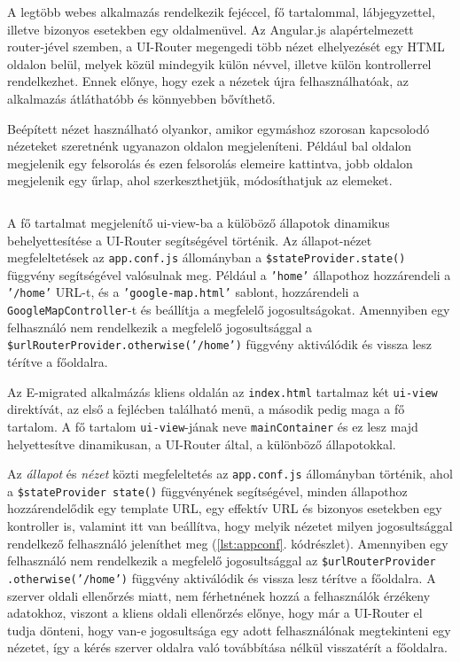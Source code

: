 A legtöbb webes alkalmazás rendelkezik  fejéccel, fő tartalommal, lábjegyzettel, illetve bizonyos esetekben egy oldalmenüvel. Az Angular.js alapértelmezett router-jével szemben, a UI-Router megengedi több nézet elhelyezését egy HTML oldalon belül, melyek közül mindegyik külön névvel, illetve külön kontrollerrel rendelkezhet. Ennek előnye, hogy ezek a nézetek újra felhasználhatóak, az alkalmazás átláthatóbb és könnyebben bővíthető. 

Beépített nézet használható olyankor, amikor egymáshoz szorosan kapcsolodó nézeteket szeretnénk ugyanazon oldalon megjeleníteni. Például bal oldalon megjelenik egy felsorolás és ezen felsorolás elemeire kattintva, jobb oldalon megjelenik egy űrlap, ahol szerkeszthetjük, módosíthatjuk az elemeket.

\begin{listing}
  \inputminted[fontsize=\small]{js}{progfiles/app.conf.js}
  \caption{A fő tartalmat megjelenítő ui-view-ba a külöböző állapotok dinamikus behelyettesítése a UI-Router segítségével történik. Az állapot-nézet megfeleltetések az \texttt{app.conf.js} állományban a \texttt{\$stateProvider.state()} függvény segítségével valósulnak meg.  Például a \texttt{'home'} állapothoz hozzárendeli a \texttt{'/home'} URL-t, és a \texttt{'google-map.html'} sablont, hozzárendeli a \texttt{GoogleMapController}-t és beállítja a megfelelő jogosultságokat. Amennyiben egy felhasználó nem rendelkezik a megfelelő jogosultsággal a \texttt{\$urlRouterProvider.otherwise('/home')} függvény aktiválódik és vissza lesz térítve a főoldalra. }
  \label{lst:appconf}
\end{listing}



Az E-migrated alkalmázás kliens oldalán az \texttt{index.html} tartalmaz két \texttt{ui-view} direktívát, az első a fejlécben található menü, a második pedig maga a fő tartalom. A fő tartalom \texttt{ui-view}-jának neve \texttt{mainContainer} és ez lesz majd helyettesítve dinamikusan, a UI-Router által, a különböző állapotokkal. 


Az \textsl{állapot} és \textsl{nézet} közti megfeleltetés az \texttt{app.conf.js} állományban történik, ahol a \texttt{\$stateProvider state()} függvényének segítségével, minden állapothoz hozzárendelődik egy template URL, egy effektív URL és bizonyos esetekben egy kontroller is, valamint itt van beállítva, hogy melyik nézetet milyen jogosultsággal rendelkező felhasználó jeleníthet meg (\ref{lst:appconf}. kódrészlet). Amennyiben egy felhasználó nem rendelkezik a megfelelő jogosultsággal az \texttt{\$urlRouterProvider} \texttt{.otherwise('/home')} függvény aktiválódik és vissza lesz térítve a főoldalra. A szerver oldali ellenőrzés miatt, nem férhetnének hozzá a felhasználók érzékeny adatokhoz, viszont a kliens oldali ellenőrzés előnye, hogy már a UI-Router el tudja dönteni, hogy van-e jogosultsága egy adott felhasználónak megtekinteni egy nézetet, így a kérés szerver oldalra való továbbítása nélkül visszatérít a főoldalra.

